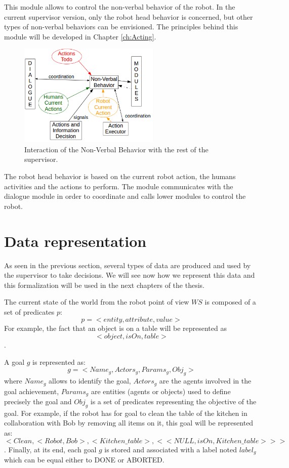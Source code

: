 \documentclass[english,a4paper,11pt,twoside]{StyleThese}
\begin{document}
This module allows to control the non-verbal behavior of the robot. In the current supervisor version, only the robot head behavior is concerned, but other types of non-verbal behaviors can be envisioned. The principles behind this module will be developed in Chapter \ref{ch:Acting}.

\begin{figure}[!h]
	\centering
    \includegraphics[width=0.6\textwidth]{figs/Chapter2/NVBehavior.png}
    \caption{Interaction of the Non-Verbal Behavior with the rest of the supervisor.}
    \label{fig:NVBehavior}
\end{figure}

The robot head behavior is based on the current robot action, the humans activities and the actions to perform. The module communicates with the dialogue module in order to coordinate and calls lower modules to control the robot. 

\section{Data representation}

\label{sec:data}

As seen in the previous section, several types of data are produced and used by the supervisor to take decisions. We will see now how we represent this data and this formalization will be used in the next chapters of the thesis.

The current state of the world from the robot point of view $WS$ is composed of a set of predicates $p$:
$$p = <entity, attribute, value>$$
For example, the fact that an object is on a table will be represented as $$<object, isOn, table>$$.

\bigskip
A goal $g$ is represented as:
$$g = <Name_g, Actors_g, Params_g, Obj_g>$$
where $Name_g$ allows to identify the goal, $Actors_g$ are the agents involved in the goal achievement, $Params_g$ are entities  (agents or objects) used to define precisely the goal and $Obj_g$ is a set of predicates representing the objective of the goal.
For example, if the robot has for goal to clean the table of the kitchen in collaboration with Bob by removing all items on it, this goal will be represented as:
$$<Clean, <Robot, Bob>, <Kitchen\_table>, <<NULL, isOn, Kitchen\_table>>>$$.
Finally, at its end, each goal $g$ is stored and associated with a label noted $label_g$ which can be equal either to DONE or ABORTED.
\end{document}
